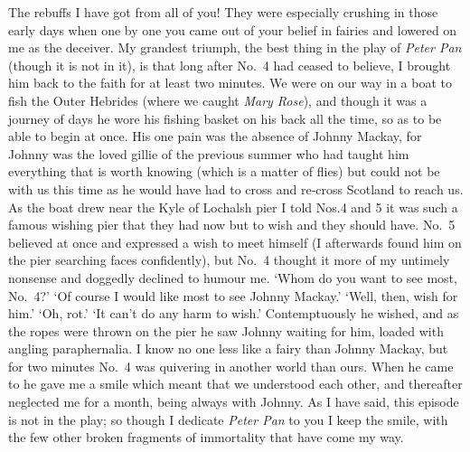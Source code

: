 The rebuffs I have got from all of you!
They were especially crushing in those early days when one by one
you came out of your belief in fairies and lowered on me as the deceiver.
My grandest triumph, the best thing in the play of \emph{Peter Pan}
(though it is not in it),
is that long after No.~4 had ceased to believe,
I brought him back to the faith for at least two minutes.
We were on our way in a boat to fish the Outer Hebrides
(where we caught \emph{Mary Rose}),
and though it was a journey of days he wore his fishing basket on his back all the time,
so as to be able to begin at once.
His one pain was the absence of Johnny Mackay,
for Johnny was the loved gillie of the previous summer
who had taught him everything that is worth knowing
(which is a matter of flies)
but could not be with us this time as he would have had to cross and re‐cross Scotland to reach us.
As the boat drew near the Kyle of Lochalsh pier
I told Nos.\@ 4 and 5 it was such a famous wishing pier
that they had now but to wish and they should have.
No.~5 believed at once and expressed a wish to meet himself
(I afterwards found him on the pier searching faces confidently),
but No.~4 thought it more of my untimely nonsense and doggedly declined to humour me.
‘Whom do you want to see most, No.~4?’
‘Of course I would like most to see Johnny Mackay.’
‘Well, then, wish for him.’
‘Oh, rot.’
‘It can’t do any harm to wish.’
Contemptuously he wished,
and as the ropes were thrown on the pier he saw Johnny waiting for him,
loaded with angling paraphernalia.
I know no one less like a fairy than Johnny Mackay,
but for two minutes No.~4 was quivering in another world than ours.
When he came to he gave me a smile which meant that we understood each other,
and thereafter neglected me for a month, being always with Johnny.
As I have said, this episode is not in the play;
so though I dedicate \emph{Peter Pan} to you I keep the smile,
with the few other broken fragments of immortality that have come my way.

\endinput
